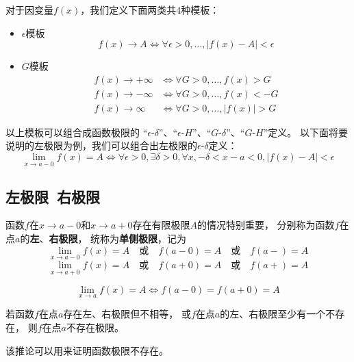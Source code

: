对于因变量$f(x)$，我们定义下面两类共4种模板：
\begin{itemize}
  \item $\epsilon$模板
  \begin{displaymath}
    f(x)\to A
    \iff \forall\epsilon>0, \dots, |f(x)-A|<\epsilon
  \end{displaymath}
  \item $G$模板
  \begin{align*}
    f(x)\to+\infty
    &\iff \forall G>0,\dots, f(x) > G \\
    f(x)\to-\infty
    &\iff \forall G>0,\dots, f(x) < -G \\
    f(x)\to\infty
    &\iff \forall G>0,\dots, |f(x)| > G
  \end{align*}
\end{itemize}

以上模板可以组合成函数极限的
``$\epsilon$-$\delta$''、``$\epsilon$-$H$''、``$G$-$\delta$''、``$G$-$H$''定义。
以下面将要说明的左极限为例，我们可以组合出左极限的$\epsilon$-$\delta$定义：
\begin{displaymath}
  \lim_{x\to a-0}f(x)=A
  \iff \forall\epsilon>0,\exists\delta>0,\forall x, -\delta<x-a<0, |f(x)-A|<\epsilon
\end{displaymath}

\subsection{左极限\ 右极限}
函数$f$在$x\to a-0$和$x\to a+0$存在有限极限$A$的情况特别重要，
分别称为函数$f$在点$a$的\textbf{左}、\textbf{右极限}，
统称为\textbf{单侧极限}，记为
\begin{displaymath}
  \lim_{x\to a-0}f(x)=A\quad\text{或}\quad f(a-0)=A\quad\text{或}\quad f(a-)=A
\end{displaymath}
\begin{displaymath}
\lim_{x\to a+0}f(x)=A\quad\text{或}\quad f(a+0)=A\quad\text{或}\quad f(a+)=A
\end{displaymath}

\begin{theorem}[函数极限与单侧极限的关系]
  \begin{displaymath}
    \lim_{x\to a}f(x)=A \iff f(a-0)=f(a+0)=A
  \end{displaymath}
\end{theorem}

\begin{corollary}
  若函数$f$在点$a$存在左、右极限但不相等，
  或$f$在点$a$的左、右极限至少有一个不存在，
  则$f$在点$a$不存在极限。
\end{corollary}
\begin{remark}
  该推论可以用来证明函数极限不存在。
\end{remark}

